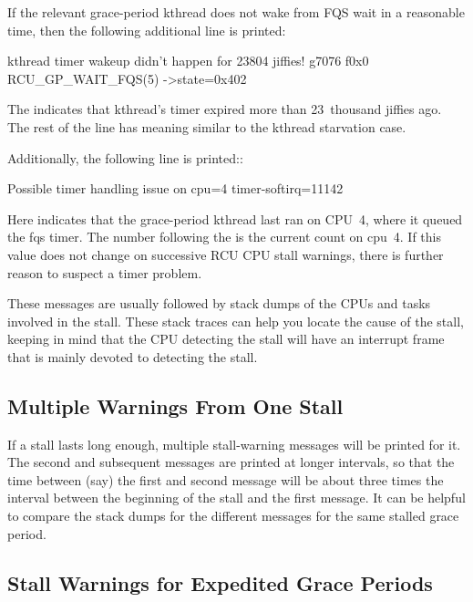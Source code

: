 If the relevant grace-period kthread does not wake from FQS wait in a
reasonable time, then the following additional line is printed:

\begin{VerbatimU}[breaklines=true]
	kthread timer wakeup didn't happen for 23804 jiffies! g7076 f0x0 RCU_GP_WAIT_FQS(5) ->state=0x402
\end{VerbatimU}

The  indicates that kthread's timer expired more than 23~thousand
jiffies ago.
The rest of the line has meaning similar to the kthread
starvation case.

Additionally, the following line is printed::

\begin{VerbatimU}
	Possible timer handling issue on cpu=4 timer-softirq=11142
\end{VerbatimU}

Here  indicates that the grace-period kthread last ran on CPU~4,
where it queued the fqs timer.
The number following the 
is the current  count on cpu~4.
If this value does not
change on successive RCU CPU stall warnings, there is further reason to
suspect a timer problem.

These messages are usually followed by stack dumps of the CPUs and tasks
involved in the stall.
These stack traces can help you locate the cause
of the stall, keeping in mind that the CPU detecting the stall will have
an interrupt frame that is mainly devoted to detecting the stall.


\subsection{Multiple Warnings From One Stall}

If a stall lasts long enough, multiple stall-warning messages will
be printed for it.
The second and subsequent messages are printed at
longer intervals, so that the time between (say) the first and second
message will be about three times the interval between the beginning
of the stall and the first message.
It can be helpful to compare the
stack dumps for the different messages for the same stalled grace period.


\subsection{Stall Warnings for Expedited Grace Periods}

